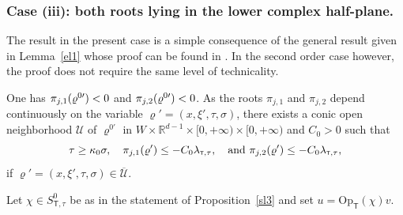 \documentclass[10pt]{amsart}
\theoremstyle{plain}
\theoremstyle{definition}
\def\R{\mathbb{R}}
\let\k\kappa
\let\y\varrho
\let \Im \relax
\DeclareMathOperator{\Im}{Im}
\newcommand{\ovl}[1]{\overline{#1}}
\newcommand{\U}{\mathscr U}
\newcommand{\Opt}{\ensuremath{\mathrm{Op}_{\scriptscriptstyle{\mathsf{T}}}}}
\newcommand{\lsct}{\lambda_{{\scriptscriptstyle{\mathsf T}},\tau}}
\newcommand{\Ssct}{S_{{\scriptscriptstyle{\mathsf T}},\tau}}
\begin{document}
\subsubsection{Case (iii): both roots lying in the lower complex half-plane.}
\label{sec: Case 2: two roots down}

The result in the present case is a simple consequence of the general
result given in Lemma~\ref{el1} whose proof can be found in
\cite{ML}. In the second order case however, the proof does not require
the same level of technicality.

One has $\Im \pi_{j,1}(\y^{0\prime}) <0$ and $\Im \pi_{j,2}(\y^{0\prime}) <0$.
As the roots $\pi_{j,1}$ and $\pi_{j,2}$ depend continuously on the
variable $\y' = (x,\xi',\tau,\sigma)$, there exists a conic open neighborhood $\U$ of $\y^{0\prime}$ in
$W\times\R^{d-1}\times[0,+\infty) \times[0,+\infty) $ and $C_0>0$ such that
\begin{equation*}
\tau \geq \k_0 \sigma, \quad \Im\pi_{j,1}(\y')\leq - C_ 0 \lsct,
\quad \text{and}\
\Im\pi_{j,2}(\y')\leq -C_0 \lsct,
\end{equation*}
if $\y'= (x,\xi',\tau,\sigma)\in\ovl{\U}$.

Let $\chi\in \Ssct^0$ be as in the statement of Proposition~\ref{sl3} and
set $u=\Opt(\chi)v$.
\end{document}
